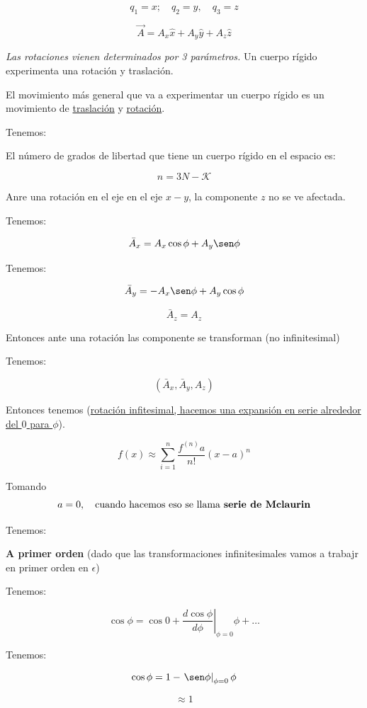 \documentclass{article}
\begin{document}
\[  q_{1} = x; \quad q_{2} = y, \quad q_{3} = z \]


\[ \vec{A} = A_{x} \hat{x} + A_{y} \hat{y} + A_{z} \hat{z} \]

\emph{Las rotaciones vienen determinados por 3 parámetros.} Un cuerpo rígido experimenta una rotación y traslación.


El movimiento más general que va a experimentar un cuerpo rígido es un movimiento de \underline{traslación} y \underline{rotación}.


Tenemos:



El número de grados de libertad que tiene un cuerpo rígido en el espacio es:


\[ n = 3N -\mathcal{K}\]


Anre una rotación en el eje en el eje $x-y$, la componente $z$ no se ve afectada.


Tenemos:


\[ \bar{A}_{x} = A_{x} \cos \phi + A_{y} \sen \phi  \]

Tenemos:


\[ \bar{A}_{y} = -A_{x}\sen\phi + A_{y}\cos\phi  \]


\[\bar{A}_{z} = {A}_{z} \]


Entonces ante una rotación las componente se transforman (no infinitesimal)

Tenemos:


\[  ( \bar{A}_{x}, \bar{A}_{y}, A_{z} ) \]


Entonces tenemos (\underline{rotación infitesimal, hacemos una expansión en serie alrededor del $0$ para $\phi$}).


\[ f(x) \approx \sum\limits_{i=1}^{n} \frac{  f^{(n) }a }{ n!  } (x-a)^{n}    \]


Tomando \[ a=0, \quad \text{cuando hacemos eso se llama \textbf{serie de Mclaurin}} \]


Tenemos:


\textbf{A primer orden} (dado que las transformaciones infinitesimales vamos a trabajr en primer orden en $\epsilon$)


Tenemos:

 \[  \cos \phi = \cos 0 + \left. \frac{d \cos \phi }{ d \phi} \right|_{\phi=0} \phi + \ldots     \]

Tenemos:

\[ \cos \phi = 1 - \left. \sen \phi \right|_{\phi=0} \phi\]

\[ \approx 1 \]
\end{document}
